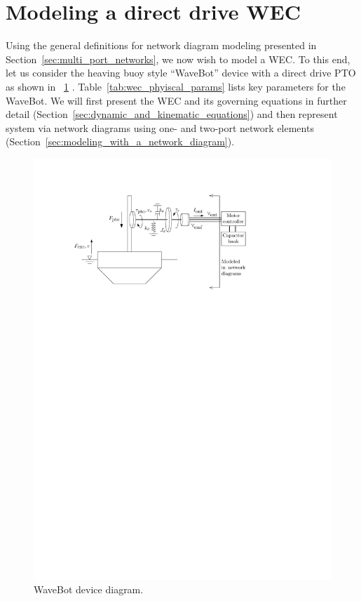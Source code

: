 \documentclass[lettersize,journal]{IEEEtran}
\begin{document}
\section{Modeling a direct drive WEC}\label{sec:modeling_a_direct_drive_wec}
Using the general definitions for network diagram modeling presented in Section~\ref{sec:multi_port_networks}, we now wish to model a WEC.
To this end, let us consider the heaving buoy style ``WaveBot'' device with a direct drive PTO as shown in \figurename~\ref{fig:wec_as_multiport_phyiscal_diagram} \cite{Forbush:2024aa}.
Table~\ref{tab:wec_phyiscal_params} lists key parameters for the WaveBot.
We will first present the WEC and its governing equations in further detail (Section~\ref{sec:dynamic_and_kinematic_equations}) and then represent system via network diagrams using one- and two-port network elements (Section~\ref{sec:modeling_with_a_network_diagram}).

\begin{figure}[tb]
        \centering
        \includegraphics[width=1\columnwidth]{wec_as_multiport_phyiscal_diagram.pdf}
        \caption{WaveBot device diagram.}
        \label{fig:wec_as_multiport_phyiscal_diagram}
\end{figure}
\end{document}
